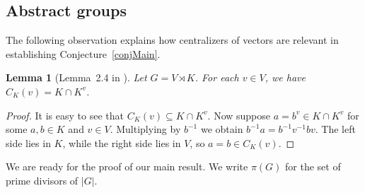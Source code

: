 \documentclass[11pt]{amsart}
\numberwithin{equation}{section}
\newtheorem{lemma}[theorem]{Lemma}
\theoremstyle{definition}
\theoremstyle{remark}
\begin{document}
\subsection{Abstract groups}

The following observation explains how centralizers of vectors
are relevant in establishing Conjecture~\ref{conjMain}.

\begin{lemma}[Lemma~2.4 in \cite{LS26}] \label{lemIntCen} 
Let $G = V \rtimes K$.
For each $v \in V$, we have $C_K(v) =K \cap K^v$.
\end{lemma} 
\begin{proof}
It is easy to see that $C_K(v) \subseteq K \cap K^v$.
Now suppose $a = b^v \in K \cap K^v$ for some $a,b \in K$ and $v \in V$.
Multiplying by $b^{-1}$ we obtain $b^{-1}a = b^{-1} v^{-1} b v$.
The left side lies in $K$, while the right side lies in $V$, so $a=b \in C_K(v)$. 
\end{proof} 

We are ready for the proof of our main result.
We write $\pi(G)$ for the set of prime divisors of $|G|$.
\end{document}
